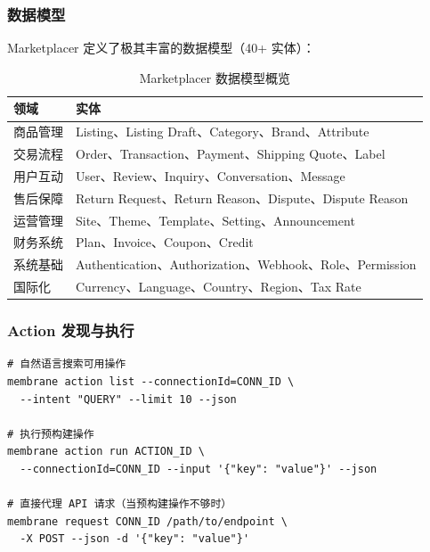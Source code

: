 \documentclass[11pt,a4paper]{article}
\begin{document}
\subsubsection{数据模型}
Marketplacer 定义了极其丰富的数据模型（40+ 实体）：

\begin{table}[h]
\centering
\small
\begin{tabular}{ll}
\toprule
\textbf{领域} & \textbf{实体} \\
\midrule
商品管理 & Listing、Listing Draft、Category、Brand、Attribute \\
交易流程 & Order、Transaction、Payment、Shipping Quote、Label \\
用户互动 & User、Review、Inquiry、Conversation、Message \\
售后保障 & Return Request、Return Reason、Dispute、Dispute Reason \\
运营管理 & Site、Theme、Template、Setting、Announcement \\
财务系统 & Plan、Invoice、Coupon、Credit \\
系统基础 & Authentication、Authorization、Webhook、Role、Permission \\
国际化 & Currency、Language、Country、Region、Tax Rate \\
\bottomrule
\end{tabular}
\caption{Marketplacer 数据模型概览}
\end{table}

\subsubsection{Action 发现与执行}
\begin{lstlisting}[caption={Action 发现示例}]
# 自然语言搜索可用操作
membrane action list --connectionId=CONN_ID \
  --intent "QUERY" --limit 10 --json

# 执行预构建操作
membrane action run ACTION_ID \
  --connectionId=CONN_ID --input '{"key": "value"}' --json

# 直接代理 API 请求（当预构建操作不够时）
membrane request CONN_ID /path/to/endpoint \
  -X POST --json -d '{"key": "value"}'
\end{lstlisting}
\end{document}

